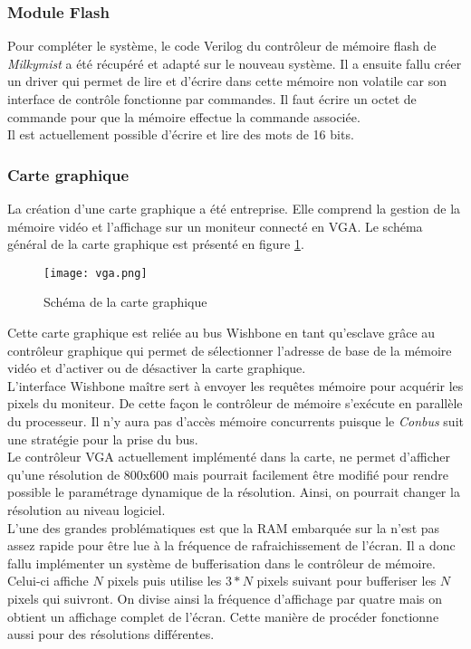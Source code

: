 \subsubsection{Module Flash}

Pour compléter le système, le code Verilog du contrôleur de mémoire flash de \textit{Milkymist} a été récupéré et adapté sur le nouveau système. Il a ensuite fallu créer un driver qui permet de lire et d'écrire dans cette mémoire non volatile car son interface de contrôle fonctionne par commandes. Il faut écrire un octet de commande pour que la mémoire effectue la commande associée.\\
Il est actuellement possible d'écrire et lire des mots de 16 bits.

\subsubsection{Carte graphique}

La création d'une carte graphique a été entreprise. Elle comprend la gestion de la mémoire vidéo et l'affichage sur un moniteur connecté en VGA. Le schéma général de la carte graphique est présenté en figure \ref{carte-graphique}.

\begin{figure}[h!]
\centering
\texttt{[image: vga.png]}
\caption{Schéma de la carte graphique}
\label{carte-graphique}
\end{figure}

Cette carte graphique est reliée au bus Wishbone en tant qu'esclave grâce au contrôleur graphique qui permet de sélectionner l'adresse de base de la mémoire vidéo et d'activer ou de désactiver la carte graphique.\\
L'interface Wishbone maître sert à envoyer les requêtes mémoire pour acquérir les pixels du moniteur. De cette façon le contrôleur de mémoire s'exécute en parallèle du processeur. Il n'y aura pas d'accès mémoire concurrents puisque le \textit{Conbus} suit une stratégie  pour la prise du bus.\\

Le contrôleur VGA actuellement implémenté dans la carte, ne permet d'afficher qu'une résolution de 800x600 mais pourrait facilement être modifié pour rendre possible le paramétrage dynamique de la résolution. Ainsi, on pourrait changer la résolution au niveau logiciel.\\
L'une des grandes problématiques est que la RAM embarquée sur la \nexys{} n'est pas assez rapide pour être lue à la fréquence de rafraichissement de l'écran. Il a donc fallu implémenter un système de bufferisation dans le contrôleur de mémoire. Celui-ci affiche $N$ pixels puis utilise les $3*N$ pixels suivant pour bufferiser les $N$ pixels qui suivront. On divise ainsi la fréquence d'affichage par quatre mais on obtient un affichage complet de l'écran. Cette manière de procéder fonctionne aussi pour des résolutions différentes.\\

